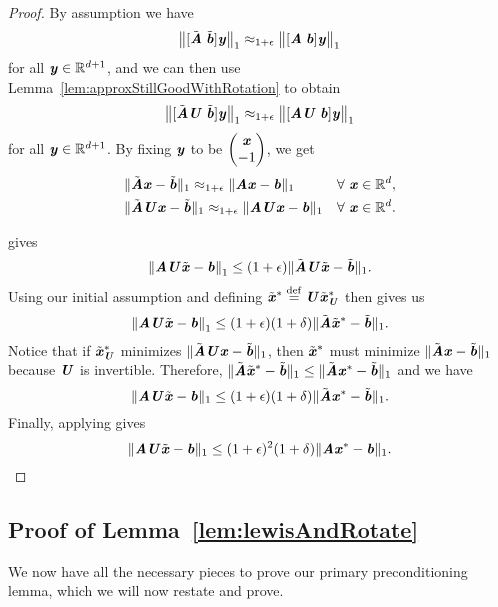 \begin{proof}
	By assumption we have 
	\[ \big\|[\tilde{\AA}\;\tilde{\bb}]\yy \big\|_1 \approx_{1 + \epsilon}\big\|[\AA\;\bb]\yy\big\|_1\]
	for all $\yy \in \R^{d+1}$, and we can then use Lemma~\ref{lem:approxStillGoodWithRotation} to obtain 
	\[ \big\|[\tilde{\AA}\UU\;\tilde{\bb}]\yy\big\|_1 \approx_{1 + \epsilon}\big\|[\AA\UU\;\bb]\yy \big\|_1\]
	for all $\yy \in \R^{d+1}$. 
	By fixing $\yy$ to be $\begin{pmatrix}
	\xx \\ -1
	\end{pmatrix}$, we get
	\begin{align}\label{eqn:approx1norm}
	& \|\tilde{\AA}\xx - \tilde{\bb}\|_1 \approx_{1+\epsilon}\|\AA\xx - \bb\|_1 &  \forall~ \xx \in \R^{d}, \\
	\label{eqn:approx1normrotated} & \|\tilde{\AA}\UU\xx - \tilde{\bb}\|_1 \approx_{1+\epsilon}\|\AA\UU\xx - \bb\|_1 &  \forall~ \xx \in \R^{d}.
	\end{align}
	
	 gives
	\[ \norm{{\AA}\UU\tilde{\xx} - {\bb}}_1\leq (1 + \epsilon)\|\tilde{\AA}\UU\tilde{\xx} - \tilde{\bb}\|_1.  \]
	Using our initial assumption and defining $\tilde{\xx}^* \defeq \UU\tilde{\xx}_{\UU}^*$ then gives us
	\[ \norm{{\AA}\UU\tilde{\xx} - {\bb}}_1\leq (1 + \epsilon)(1 + \delta)\|\tilde{\AA}\tilde{\xx}^* - \tilde{\bb}\|_1.  \]
	Notice that if $\tilde{\xx}_{\UU}^*$ minimizes $\|\tilde{\AA}\UU\xx - \tilde{\bb}\|_1$,
	then $\tilde{\xx}^*$ must minimize $\|\tilde{\AA}\xx - \tilde{\bb}\|_1$ because $\UU$ is invertible.
	Therefore, $\|\tilde{\AA}\tilde{\xx}^* - \tilde{\bb}\|_1 \leq \|\tilde{\AA}\xx^* - \tilde{\bb}\|_1$ and we have 
	\[ \|{\AA}\UU\tilde{\xx} - {\bb}\|_1\leq (1 + \epsilon)(1 + \delta)\|\tilde{\AA}{\xx}^* - \tilde{\bb}\|_1.  \]
	Finally, applying  gives
	\[ \|{\AA}\UU\tilde{\xx} - {\bb}\|_1\leq (1 + \epsilon)^2(1 + \delta)\|{\AA}{\xx}^* - {\bb}\|_1.
	\]
\end{proof}

%


\subsection{Proof of Lemma~\ref{lem:lewisAndRotate}}\label{subsec:proof}

We now have all the necessary pieces to prove our primary preconditioning lemma, which we will now restate and prove.

